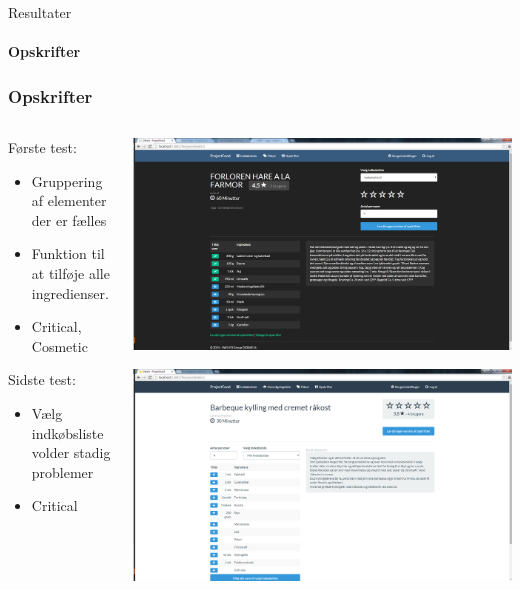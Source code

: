 \begin{frame}{Resultater}
\framesubtitle{Opskrifter}
	\subsubsection{Opskrifter}
	
	\begin{minipage}[0.3\textheight]{\textwidth}
	\begin{columns}[T]
	\begin{column}{0.5\textwidth}
	
	Første test:
	\begin{itemize}
	\item Gruppering af elementer der er fælles
	\item Funktion til at tilføje alle ingredienser.
	\item Critical, Cosmetic
	\end{itemize}
	Sidste test:
	\begin{itemize}
		\item Vælg indkøbsliste volder stadig problemer
		\item Critical
	\end{itemize}
	\end{column}
	\begin{column}{0.5\textwidth}
	 \includegraphics[width=1\textwidth,height=1\textheight,keepaspectratio, trim={1cm 0 0 16mm}, clip]{images/Screenshots/PickedRecipeOld.png}
	 
	 \vspace{2 mm}
	  
	  \includegraphics[width=1\textwidth,height=1\textheight,keepaspectratio, trim={1cm 0 0 16mm}, clip]{images/Screenshots/PickedRecipe.png}
	\end{column}
	\end{columns}
	


\end{minipage}
\end{frame}
